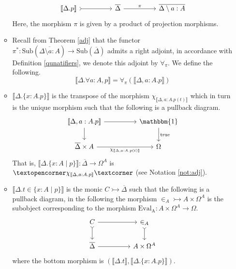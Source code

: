 \documentclass{tac}
\newcommand{\adj}[1]{\text{\textopencorner}{#1}\text{\textcorner}}
\newcommand{\lto}{\longrightarrow}
\begin{document}
\begin{definition}
\begin{itemize}
\begin{itemize}
				\[
				\begin{tikzcd}[column sep = huge]
					\llbracket \Delta. p\rrbracket\arrow[r,rightarrowtail] & \overline{\Delta}\arrow[r,"{\pi}"] & \overline{\Delta\setminus a:A}
				\end{tikzcd}
				\]
				Here, the morphism $\pi$ is given by a product of projection morphisms.
				\item Recall from Theorem \ref{adj} that the functor $\pi^\ast: \text{Sub}(\overline{\Delta \setminus a:A}) \to \text{Sub}(\overline{\Delta})$ admits a right adjoint, in accordance with Definition \ref{qunatifiers}, we denote this adjoint by 
				$\forall_\pi$. We define the following.
				\begin{equation}
					\llbracket \Delta . \forall a:A, p\rrbracket = \forall_\pi(\llbracket \Delta,a:A . p \rrbracket)
				\end{equation}        
				\item $\llbracket \Delta . \lbrace x : A . p \rbrace \rrbracket$ is the transpose of the morphism $\chi_{\llbracket \Delta, a:A . p(t) \rrbracket}$ which in turn is the unique morphism such that the following is a pullback diagram.
				\[
				\begin{tikzcd}[column sep = huge]
					\llbracket \Delta, a:A . p \rrbracket\arrow[r]\arrow[d] & \mathbbm{1}\arrow[d,"{\text{true}}"]\\
					\overline{\Delta} \times A\arrow[r,swap,"{\chi_{\llbracket \Delta, a:A . p(t) \rrbracket}}"] & \Omega
				\end{tikzcd}
				\]
				That is, $\llbracket \Delta . \{ x:A \mid p \} \rrbracket: \overline{\Delta} \to \Omega^A$ is $\adj{\chi_{\llbracket \Delta, a:A . p\rrbracket}}$ (see Notation \ref{not:adj}).
				\item $\llbracket \Delta . t \in \lbrace x:A \mid p \rbrace\rrbracket$ is the monic $C \rightarrowtail \overline{\Delta}$ such that the following is a pullback diagram, in the following the morphism $\in_A \rightarrowtail A \times \Omega^A$ is the subobject corresponding to the morphism $\operatorname{Eval_A}: A \times \Omega^A \lto \Omega$.
				\[
				\begin{tikzcd}[column sep = huge]
					C\arrow[d,rightarrowtail]\arrow[r] & \in_A\arrow[d,rightarrowtail]\\
					\overline{\Delta}\arrow[r,swap] & A \times \Omega^A
				\end{tikzcd}
				\]
				where the bottom morphism is ${( \llbracket \Delta . t \rrbracket,\llbracket \Delta . \lbrace x:A . p \rbrace \rrbracket)}$.
			\end{itemize}
		\end{itemize}
	\end{definition}
\end{document}
